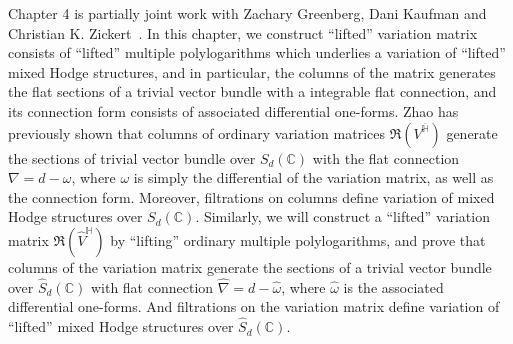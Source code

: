 Chapter 4 is partially joint work with Zachary Greenberg, Dani Kaufman and Christian K. Zickert~\cite{ZDHZ_HopfAlgebrasOfMultiplePolylogarithmsAndHolomorphicOneForms}. In this chapter, we construct ``lifted'' variation matrix consists of ``lifted'' multiple polylogarithms which underlies a variation of ``lifted'' mixed Hodge structures, and in particular, the columns of the matrix generates the flat sections of a trivial vector bundle with a integrable flat connection, and its connection form consists of associated differential one-forms. Zhao has previously shown that columns of ordinary variation matrices $\Re(V^{\overline{\mathbb H}})$ generate the sections of trivial vector bundle over $S_d(\mathbb C)$ with the flat connection $\nabla=d-\omega$, where $\omega$ is simply the differential of the variation matrix, as well as the connection form. Moreover, filtrations on columns define variation of mixed Hodge structures over $S_d(\mathbb C)$. Similarly, we will construct a ``lifted'' variation matrix $\Re(\widehat V^{\mathbb H})$ by ``lifting'' ordinary multiple polylogarithms, and prove that columns of the variation matrix generate the sections of a trivial vector bundle over $\widehat S_d(\mathbb C)$ with flat connection $\widehat\nabla=d-\widehat\omega$, where $\widehat\omega$ is the associated differential one-forms. And filtrations on the variation matrix define variation of ``lifted'' mixed Hodge structures over $\widehat S_d(\mathbb C)$.